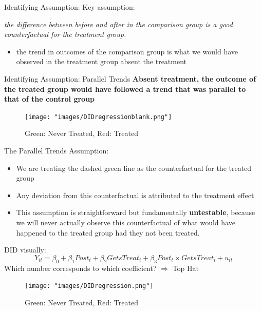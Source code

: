 \documentclass[
  ignorenonframetext,
]{beamer}
\providecommand{\tightlist}{%
  \setlength{\itemsep}{0pt}\setlength{\parskip}{0pt}}
\begin{document}
\begin{frame}{Identifying Assumption:}
\protect\hypertarget{identifying-assumption}{}
Key assumption:

\textit{the difference between before and after in the comparison group is a good counterfactual for the treatment group.}

\begin{itemize}
\tightlist
\item
  the trend in outcomes of the comparison group is what we would have
  observed in the treatment group absent the treatment
\end{itemize}
\end{frame}

\begin{frame}{Identifying Assumption: Parallel Trends}
\protect\hypertarget{identifying-assumption-parallel-trends}{}
\textbf{Absent treatment, the outcome of the treated group would have
followed a trend that was parallel to that of the control group}

\begin{figure}
\centering
\texttt{[image: "images/DIDregressionblank.png"]}
\caption{Green: Never Treated, Red: Treated}
\end{figure}
\end{frame}

\begin{frame}{The Parallel Trends Assumption:}
\protect\hypertarget{the-parallel-trends-assumption}{}
\begin{itemize}
\item
  We are treating the dashed green line as the counterfactual for the
  treated group
\item
  Any deviation from this counterfactual is attributed to the treatment
  effect
\item
  This assumption is straightforward but fundamentally
  \textbf{untestable}, because we will never actually observe this
  counterfactual of what would have happened to the treated group had
  they not been treated.
\end{itemize}
\end{frame}

\begin{frame}{DID visually:}
\protect\hypertarget{did-visually}{}
\[
Y_{it}=\beta_0+\beta_1 Post_t+\beta_2 GetsTreat_i+\beta_3 Post_t\times GetsTreat_i+u_{it}
\] Which number corresponds to which coefficient? \(\Rightarrow\) Top
Hat

\begin{figure}
\centering
\texttt{[image: "images/DIDregression.png"]}
\caption{Green: Never Treated, Red: Treated}
\end{figure}
\end{frame}
\end{document}
